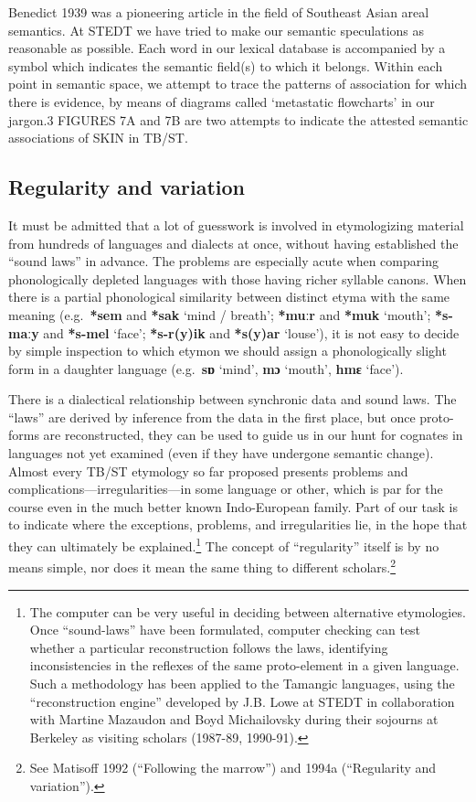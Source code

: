 Benedict 1939 was a pioneering article in the field of Southeast Asian areal semantics. At STEDT we have tried to make our semantic speculations as reasonable as possible. Each word in our lexical database is accompanied by a symbol which indicates the semantic field(s) to which it belongs. Within each point in semantic space, we attempt to trace the patterns of association for which there is evidence, by means of diagrams called ‘metastatic flowcharts’ in our jargon.3 FIGURES 7A and 7B are two attempts to indicate the attested semantic associations of SKIN in TB/ST.


\subsection{Regularity and variation}

It must be admitted that a lot of guesswork is involved in etymologizing
material from hundreds of languages and dialects at once, without having
established the “sound laws” in advance. The problems are especially acute when
comparing phonologically depleted languages with those having richer syllable
canons. When there is a partial phonological similarity between distinct etyma
with the same meaning (e.g.\ \textbf{*sem} and \textbf{*sak}  ‘mind / breath’;
\textbf{*muːr} and \textbf{*muk}
‘mouth’; \textbf{*s-maːy} and \textbf{*s-mel} ‘face’;
\textbf{*s-r(y)ik} and \textbf{*s(y)ar} ‘louse’), it is not
easy to decide by simple inspection to which etymon we should assign a
phonologically slight form in a daughter language (e.g.\ \textbf{sɒ} ‘mind’,
\textbf{mɔ} ‘mouth’,
\textbf{hmɛ} ‘face’).


There is a dialectical relationship between synchronic data and sound laws.
The “laws” are derived by inference from the data in the first place, but once
proto-forms are reconstructed, they can be used to guide us in our hunt for
cognates in languages not yet examined (even if they have undergone semantic
change). Almost every TB/ST etymology so far proposed presents problems and
complications—irregularities—in some language or other, which is par for
the course even in the much better known Indo-European family. Part of our task
is to indicate where the exceptions, problems, and irregularities lie, in the
hope that they can ultimately be explained.\footnote{The computer can be very
useful in deciding between alternative etymologies. Once “sound-laws” have been
formulated, computer checking can test whether a particular reconstruction
follows the laws, identifying inconsistencies in the reflexes of the same
proto-element in a given language. Such a methodology has been applied to the
Tamangic languages, using the “reconstruction engine” developed by J.B. Lowe at
STEDT in collaboration with Martine Mazaudon and Boyd Michailovsky during their
sojourns at Berkeley as visiting scholars (1987-89, 1990-91).} The concept of
“regularity” itself is by no means simple, nor does it mean the same thing to
different scholars.\footnote{See Matisoff 1992 (“Following the marrow”) and
1994a (“Regularity and variation”).}



